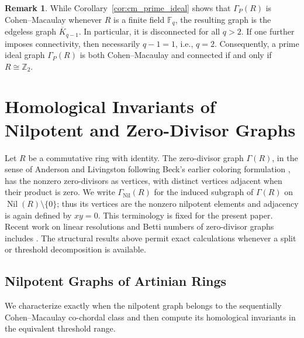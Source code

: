 \documentclass[12pt, reqno]{amsart}
\theoremstyle{definition}
\newtheorem{remark}[theorem]{Remark}
\numberwithin{equation}{section}
\begin{document}
	\begin{remark}
		While Corollary~\ref{cor:cm_prime_ideal} shows that $\Gamma_P(R)$ is Cohen--Macaulay whenever $R$ is a finite field $\mathbb F_q$, the resulting graph is the edgeless graph $\overline{K}_{q-1}$. In particular, it is disconnected for all $q>2$. If one further imposes connectivity, then necessarily $q-1=1$, i.e., $q=2$. Consequently, a prime ideal graph $\Gamma_P(R)$ is both Cohen--Macaulay and connected if and only if $R \cong \mathbb Z_2$.
	\end{remark}
	
	\section{Homological Invariants of Nilpotent and Zero-Divisor Graphs} \label{sec:zero_divisors}
	
	Let $R$ be a commutative ring with identity.  The zero-divisor graph $\Gamma(R)$, in the sense of Anderson and Livingston \cite{anderson1999} following Beck's earlier coloring formulation \cite{beck1988}, has the nonzero zero-divisors as vertices, with distinct vertices adjacent when their product is zero.  We write $\Gamma_{\operatorname{Nil}}(R)$ for the induced subgraph of $\Gamma(R)$ on $\operatorname{Nil}(R)\setminus\{0\}$; thus its vertices are the nonzero nilpotent elements and adjacency is again defined by $xy=0$.  This terminology is fixed for the present paper.  Recent work on linear resolutions and Betti numbers of zero-divisor graphs includes \cite{dung2026,rather2024_zd,rather2026}.  The structural results above permit exact calculations whenever a split or threshold decomposition is available.
	
	\subsection{Nilpotent Graphs of Artinian Rings}
	We characterize exactly when the nilpotent graph belongs to the sequentially Cohen--Macaulay co-chordal class and then compute its homological invariants in the equivalent threshold range.
	
\end{document}
